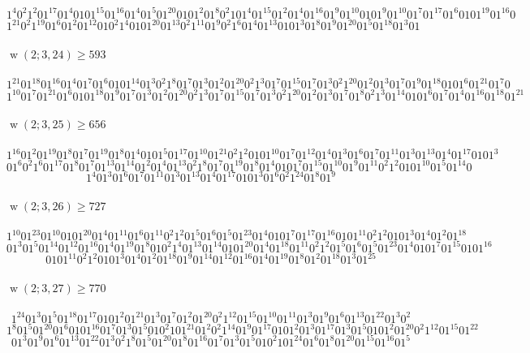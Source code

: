 \documentclass[final,3p,times]{elsarticle}
\theoremstyle{definition}
\DeclareMathOperator{\vdw}{w}
\begin{document}
\begin{appendix}
$$1^{4}0^{2}1^{2}01^{17}01^{4}0101^{15}01^{16}01^{4}01^{5}01^{20}0101^{2}01^{8}0^{2}101^{4}0
1^{15}01^{2}01^{4}01^{16}01^{9}01^{10}0101^{9}01^{10}01^{7}01^{17}01^{6}0101^{19}01^{16}0$$
$$1^{21}0^{2}1^{19}01^{6}01^{2}01^{12}010^{2}1^{4}0101^{20}01^{13}0^{2}1^{11}01^{9}0^{2}1^{6}0
1^{4}01^{13}0101^{3}01^{8}01^{9}01^{20}01^{5}01^{18}01^{3}01$$

\paragraph{$\vdw(2; 3, 24)\geq 593$}

$$1^{21}01^{18}01^{16}01^{4}01^{7}01^{6}0101^{14}01^{3}0^{2}1^{8}01^{7}01^{3}01^{2}01^{20}0^{2}
1^{3}01^{7}01^{15}01^{7}01^{3}0^{2}1^{20}01^{2}01^{3}01^{7}01^{9}01^{18}0101^{6}01^{21}01^{7}0$$
$$1^{10}01^{7}01^{21}01^{6}0101^{18}01^{9}01^{7}01^{3}01^{2}01^{20}0^{2}1^{3}01^{7}01^{15}01^{7}0
1^{3}0^{2}1^{20}01^{2}01^{3}01^{7}01^{8}0^{2}1^{3}01^{14}0101^{6}01^{7}01^{4}01^{16}01^{18}01^{21}$$

\paragraph{$\vdw(2; 3, 25)\geq 656$}
$$1^{16}01^{2}01^{19}01^{8}01^{7}01^{19}01^{8}01^{4}0101^{5}01^{17}01^{10}01^{21}0^{2}
1^{2}0101^{10}01^{7}01^{12}01^{4}01^{3}01^{6}01^{7}01^{11}01^{3}01^{13}01^{4}01^{17}0101^{3}$$
$$01^{6}0^{2}1^{6}01^{17}01^{8}01^{7}01^{13}01^{14}01^{2}01^{4}01^{13}0^{2}1^{8}01^{7}0
1^{19}01^{8}01^{4}0101^{7}01^{15}01^{10}01^{9}01^{11}0^{2}1^{2}0101^{10}01^{5}01^{14}0$$
$$1^{4}01^{3}01^{6}01^{7}01^{11}01^{3}01^{13}01^{4}01^{17}0101^{3}01^{6}0^{2}1^{24}01^{8}01^{9}$$

\paragraph{$\vdw(2; 3, 26)\geq 727$}
$$1^{10}01^{23}01^{10}0101^{20}01^{4}01^{11}01^{6}01^{11}0^{2}1^{2}01^{5}01^{6}01^{5}01^{23}0
1^{4}0101^{7}01^{17}01^{16}0101^{11}0^{2}1^{2}0101^{3}01^{4}01^{2}01^{18}$$
$$01^{3}01^{5}01^{14}01^{12}01^{16}01^{4}01^{19}01^{8}010^{2}1^{4}01^{13}01^{14}0101^{20}0
1^{4}01^{18}01^{11}0^{2}1^{2}01^{5}01^{6}01^{5}01^{23}01^{4}0101^{7}01^{15}0101^{16}$$
$$0101^{11}0^{2}1^{2}0101^{3}01^{4}01^{2}01^{18}01^{9}01^{14}01^{12}0
1^{16}01^{4}01^{19}01^{8}01^{2}01^{18}01^{3}01^{25}$$

\paragraph{$\vdw(2; 3, 27)\geq 770$}
$$1^{24}01^{3}01^{5}01^{18}01^{17}0101^{2}01^{21}01^{3}01^{7}01^{2}01^{20}0^{2}1^{12}0
1^{15}01^{10}01^{11}01^{3}01^{9}01^{6}01^{13}01^{22}01^{3}0^{2}$$
$$1^{8}01^{5}01^{20}01^{6}0101^{16}01^{7}01^{3}01^{5}010^{2}101^{21}01^{2}0^{2}1^{14}01^{9}0
1^{17}0101^{2}01^{3}01^{17}01^{3}01^{5}0101^{2}01^{20}0^{2}1^{12}01^{15}01^{22}$$
$$01^{3}01^{9}01^{6}01^{13}01^{22}01^{3}0^{2}1^{8}01^{5}01^{20}01^{8}01^{16}01^{7}0
1^{3}01^{5}010^{2}101^{24}01^{6}01^{8}01^{20}01^{15}01^{16}01^{5}$$


\end{appendix}
\end{document}
